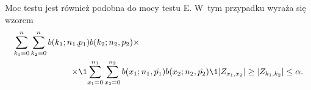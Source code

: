 Moc testu jest również podobna do mocy testu E. W~tym przypadku wyraża się wzorem
\begin{equation}
\begin{split}
\sum_{k_1=0}^{n}\sum_{k_2=0}^{n} b(k_1;n_1,&p_1)b(k_2;n_2,p_2) \times \\
\times &\1{\sum_{x_1=0}^{n_1} \sum_{x_2=0}^{n_2} b(x_1;n_1,\hat{p_1}) b(x_2;n_2,\hat{p_2}) \1{|Z_{x_1,x_2}|\geq|Z_{k_1,k_2}|} \leq\alpha}.
\end{split}
\end{equation}


